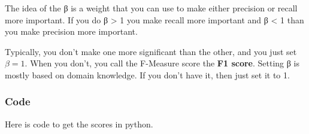 \documentclass[
  11pt,
  british,
]{article}
\begin{document}
The idea of the β is a weight that you can use to make either precision
or recall more important. If you do β \textgreater{} 1 you make recall
more important and β \textless{} 1 than you make precision more
important.

Typically, you don't make one more significant than the other, and you
just set \(β = 1\). When you don't, you call the F-Measure score the
\textbf{F1 score}. Setting β is mostly based on domain knowledge. If you
don't have it, then just set it to 1.

\hypertarget{code}{%
\subsubsection{Code}\label{code}}

Here is code to get the scores in python.
\end{document}
